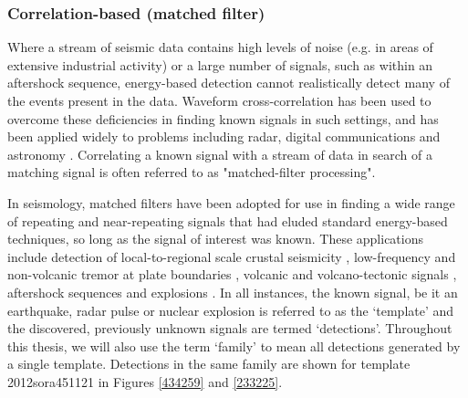 \subsubsection{Correlation-based (matched filter)}\label{MF}
Where a stream of seismic data contains high levels of noise (e.g. in areas of extensive industrial activity) or a large number of signals, such as within an aftershock sequence, energy-based detection cannot realistically detect many of the events present in the data. Waveform cross-correlation has been used to overcome these deficiencies in finding known signals in such settings, and has been applied widely to problems including radar, digital communications and astronomy \citep[e.g.][]{Turin_1960,Abbott_2016}. Correlating a known signal with a stream of data in search of a matching signal is often referred to as "matched-filter processing".

In seismology, matched filters have been adopted for use in finding a wide range of repeating and near-repeating signals that had eluded standard energy-based techniques, so long as the signal of interest was known. These applications include detection of local-to-regional scale crustal seismicity \cite{Schaff_2011,Dodge_2015,Chamberlain_2017}, low-frequency and non-volcanic tremor at plate boundaries \citep{Shelly_2007,Chamberlain_2014}, volcanic and volcano-tectonic signals \citep{Shelly_2016,Hotovec_Ellis_2018}, aftershock sequences \citep{Warren_Smith_2017} and explosions \citep{Gibbons_2006,Gibbons_2012}. In all instances, the known signal, be it an earthquake, radar pulse or nuclear explosion is referred to as the `template' and the discovered, previously unknown signals are termed `detections'. Throughout this thesis, we will also use the term `family' to mean all detections generated by a single template. Detections in the same family are shown for template 2012sora451121 in Figures \ref{434259} and \ref{233225}.

